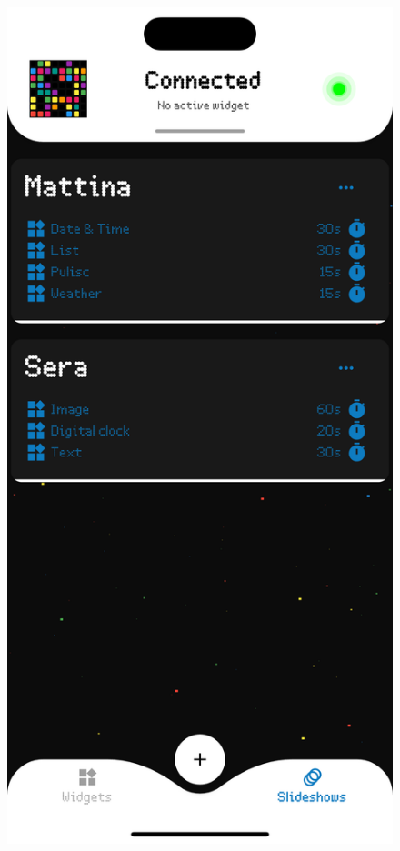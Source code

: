 \begin{figure}[h]
    \centering
    \begin{minipage}[b]{0.32\textwidth}
        \centering
        \includegraphics[width=\textwidth]{tesi/img/client_demo/slideshows/page.png}

\end{minipage}
\end{figure}
